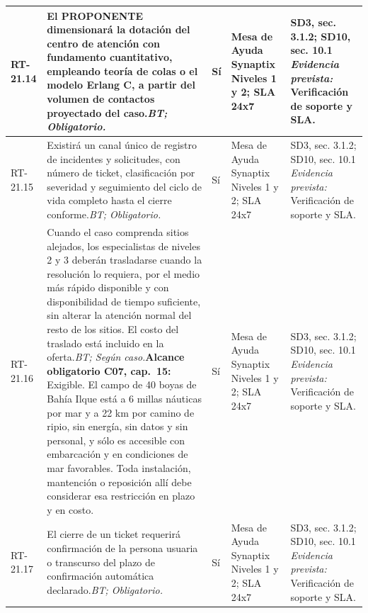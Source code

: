 \begin{paginaHorizontalSynaptix}
\begin{longtable}{|L{0.09\AnchoMatrizTDoce}|L{0.385\AnchoMatrizTDoce}|L{0.065\AnchoMatrizTDoce}|L{0.18\AnchoMatrizTDoce}|L{0.28\AnchoMatrizTDoce}|}
RT-\allowbreak{}21.\allowbreak{}14 &
El PROPONENTE dimensionará la dotación del centro de atención con fundamento cuantitativo, empleando teoría de colas o el modelo Erlang C, a partir del volumen de contactos proyectado del caso.\newline\textit{BT; Obligatorio.} &
Sí &
Mesa de Ayuda Synaptix Niveles 1 y 2; SLA 24x7 &
SD3, sec. 3.1.2; SD10, sec. 10.1 \newline\textit{Evidencia prevista:} Verificación de soporte y SLA. \\ \hline

RT-\allowbreak{}21.\allowbreak{}15 &
Existirá un canal único de registro de incidentes y solicitudes, con número de ticket, clasificación por severidad y seguimiento del ciclo de vida completo hasta el cierre conforme.\newline\textit{BT; Obligatorio.} &
Sí &
Mesa de Ayuda Synaptix Niveles 1 y 2; SLA 24x7 &
SD3, sec. 3.1.2; SD10, sec. 10.1 \newline\textit{Evidencia prevista:} Verificación de soporte y SLA. \\ \hline

RT-\allowbreak{}21.\allowbreak{}16 &
Cuando el caso comprenda sitios alejados, los especialistas de niveles 2 y 3 deberán trasladarse cuando la resolución lo requiera, por el medio más rápido disponible y con disponibilidad de tiempo suficiente, sin alterar la atención normal del resto de los sitios. El costo del traslado está incluido en la oferta.\newline\textit{BT; Según caso.}\newline\textbf{Alcance obligatorio C07, cap.~15:} Exigible. El campo de 40 boyas de Bahía Ilque está a 6 millas náuticas por mar y a 22 km por camino de ripio, sin energía, sin datos y sin personal, y sólo es accesible con embarcación y en condiciones de mar favorables. Toda instalación, mantención o reposición allí debe considerar esa restricción en plazo y en costo. &
Sí &
Mesa de Ayuda Synaptix Niveles 1 y 2; SLA 24x7 &
SD3, sec. 3.1.2; SD10, sec. 10.1 \newline\textit{Evidencia prevista:} Verificación de soporte y SLA. \\ \hline

RT-\allowbreak{}21.\allowbreak{}17 &
El cierre de un ticket requerirá confirmación de la persona usuaria o transcurso del plazo de confirmación automática declarado.\newline\textit{BT; Obligatorio.} &
Sí &
Mesa de Ayuda Synaptix Niveles 1 y 2; SLA 24x7 &
SD3, sec. 3.1.2; SD10, sec. 10.1 \newline\textit{Evidencia prevista:} Verificación de soporte y SLA. \\ \hline


\end{longtable}
\end{paginaHorizontalSynaptix}
